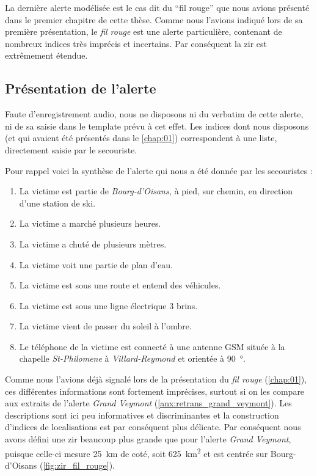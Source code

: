 La dernière alerte modélisée est le cas dit du \enquote{fil rouge} que
nous avions présenté dans le premier chapitre de cette thèse. Comme
nous l'avions indiqué lors de sa première présentation, le \emph{fil
  rouge} est une alerte particulière, contenant de nombreux indices
très imprécis et incertains. Par conséquent la \ac{zir} est
extrêmement étendue.


\subsection{Présentation de l'alerte}
\label{subsec:9-4-1}

Faute d'enregistrement audio, nous ne disposons ni du verbatim de
cette alerte, ni de sa saisie dans le template prévu à cet effet. Les
indices dont nous disposons (et qui avaient été présentés dans le
\autoref{chap:01}) correspondent à une liste, directement saisie par
le secouriste. 

Pour rappel voici la synthèse de l'alerte qui nous a été donnée par
les secouristes :
%
\begin{enumerate}
\item La victime est partie de \emph{Bourg-d'Oisans,} à pied, sur
  chemin, en direction d'une station de ski.
\item La victime a marché plusieurs heures.
\item La victime a chuté de plusieurs mètres.
\item La victime voit une partie de plan d'eau.
\item La victime est sous une route et entend des véhicules.
\item La victime est sous une ligne électrique 3 brins.
\item La victime vient de passer du soleil à l'ombre.
\item Le téléphone de la victime est connecté à une antenne GSM située
  à la chapelle \emph{St-Philomene} à \emph{Villard-Reymond} et
  orientée à \SI{90}{\degree}.
\end{enumerate}

Comme nous l'avions déjà signalé lors de la présentation du \emph{fil
  rouge} (\autoref{chap:01}), ces différentes informations sont
fortement imprécises, surtout si on les compare aux extraits de
l'alerte \emph{Grand Veymont}
(\autoref{anx:retrans_grand_veymont}). Les descriptions sont ici peu
informatives et discriminantes et la construction d'indices de
localisations est par conséquent plus délicate. Par conséquent nous
avons défini une \ac{zir} beaucoup plus grande que pour l'alerte
\emph{Grand Veymont}, puisque celle-ci mesure \SI{25}{\kilo\meter} de
coté, soit \SI{625}{\kilo\meter\squared} et est centrée sur
Bourg-d'Oisans (\autoref{fig:zir_fil_rouge}).

